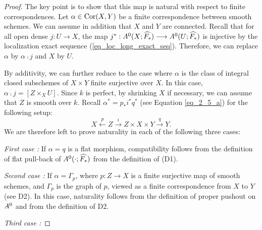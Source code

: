 \begin{proof}
The key point is to show that this map is natural with respect to
finite correspondences. Let $\alpha \in \mathrm{Cor}(X, Y)$ be a finite 
correspondence between smooth schemes. We can assume in addition 
that $X$ and $Y$ are connected. Recall that for all open dense 
$j: U \to X$, the map $j^* : A^0(X; \widehat{F_*}) \longrightarrow 
A^0(U; \widehat{F_*})$ is injective by the localization 
exact sequence (\ref{eq_loc_long_exact_seq}). Therefore, we can 
replace $\alpha$ by $\alpha \comp j$ and $X$ by $U$.

By additivity, we can further reduce to the case where $\alpha$ is
the class of integral closed subschemes of $X \times Y$ finite 
surjective over $X$. In this case, $\alpha \comp j = [Z \times_X 
U].$ Since $k$ is perfect, by shrinking $X$ if necessary, we can
assume that $Z$ is smooth over $k$. Recall $\alpha^* = p_*i^*q^*$ 
(see Equation \ref{eq_2_5_a}) for the following setup:
\[
X \stackrel{p}{\longleftarrow} Z \stackrel{i}{\rightarrow} 
   Z \times X \times Y \stackrel{q}{\rightarrow} Y.
\]
We are therefore left to prove naturality in each of the following
three cases:

\emph{First case : } If $\alpha = q$ is a flat morphism, 
compatibility follows from the definition of flat pull-back of
$A^0(\cdot; \widehat{F_*})$ from the definition of (D1).

\emph{Second case : } If $\alpha = \Gamma_p$, where $p : Z \to X$
is a finite surjective map of smooth schemes, and $\Gamma_p$ is
the graph of $p$, viewed as a finite correspondence from $X$ to 
$Y$ (see D2). In this case, naturality follows from the definition 
of proper pushout on $A^0$ and from the definition of D2.

\emph{Third case : }
\end{proof}
